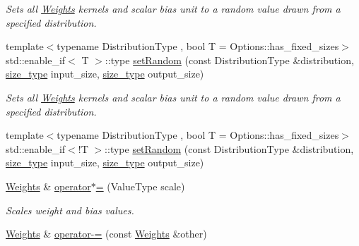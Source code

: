 \begin{DoxyCompactItemize}
\begin{DoxyCompactList}\small\item\em Sets all \hyperlink{classffnn_1_1layer_1_1fully__connected_1_1_weights}{Weights} kernels and scalar bias unit to a random value drawn from a specified distribution. \end{DoxyCompactList}\item 
{\footnotesize template$<$typename Distribution\-Type , bool T = Options\-::has\-\_\-fixed\-\_\-sizes$>$ }\\std\-::enable\-\_\-if$<$ T $>$\-::type \hyperlink{classffnn_1_1layer_1_1fully__connected_1_1_weights_a5f7cc9a635c17f41f9afc09ba9e8fdd3}{set\-Random} (const Distribution\-Type \&distribution, \hyperlink{namespaceffnn_a63b90a2fd70eb76684eac482a51633e5}{size\-\_\-type} input\-\_\-size, \hyperlink{namespaceffnn_a63b90a2fd70eb76684eac482a51633e5}{size\-\_\-type} output\-\_\-size)
\begin{DoxyCompactList}\small\item\em Sets all \hyperlink{classffnn_1_1layer_1_1fully__connected_1_1_weights}{Weights} kernels and scalar bias unit to a random value drawn from a specified distribution. \end{DoxyCompactList}\item 
{\footnotesize template$<$typename Distribution\-Type , bool T = Options\-::has\-\_\-fixed\-\_\-sizes$>$ }\\std\-::enable\-\_\-if$<$!T $>$\-::type \hyperlink{classffnn_1_1layer_1_1fully__connected_1_1_weights_ac208d20c12ccc0409467a45cef06b79d}{set\-Random} (const Distribution\-Type \&distribution, \hyperlink{namespaceffnn_a63b90a2fd70eb76684eac482a51633e5}{size\-\_\-type} input\-\_\-size, \hyperlink{namespaceffnn_a63b90a2fd70eb76684eac482a51633e5}{size\-\_\-type} output\-\_\-size)
\item 
\hyperlink{classffnn_1_1layer_1_1fully__connected_1_1_weights}{Weights} \& \hyperlink{classffnn_1_1layer_1_1fully__connected_1_1_weights_add66d266dff8ea2b5b82524943d186e3}{operator$\ast$=} (Value\-Type scale)
\begin{DoxyCompactList}\small\item\em Scales weight and bias values. \end{DoxyCompactList}\item 
\hyperlink{classffnn_1_1layer_1_1fully__connected_1_1_weights}{Weights} \& \hyperlink{classffnn_1_1layer_1_1fully__connected_1_1_weights_a81bee14ac3a3df0867dae9466582e8c9}{operator-\/=} (const \hyperlink{classffnn_1_1layer_1_1fully__connected_1_1_weights}{Weights} \&other)

\end{DoxyCompactItemize}
